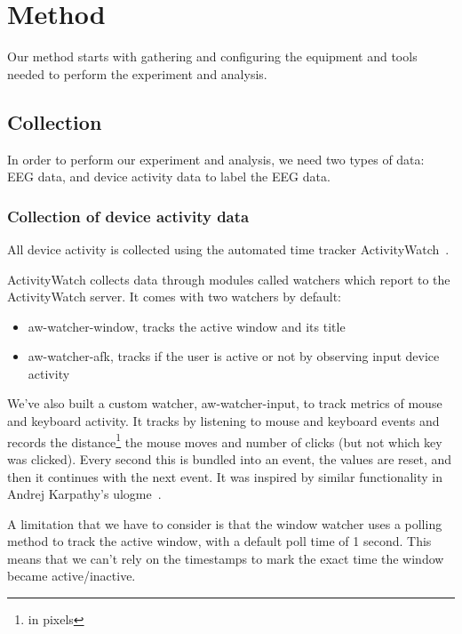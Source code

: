 \chapter{Method}

Our method starts with gathering and configuring the equipment and tools needed to perform the experiment and analysis.

\section{Collection}

In order to perform our experiment and analysis, we need two types of data: EEG data, and device activity data to label the EEG data.

    \subsection{Collection of device activity data}

        All device activity is collected using the automated time tracker ActivityWatch~\cite{bjareholt_activitywatch_2020-1}.

        ActivityWatch collects data through modules called watchers which report to the ActivityWatch server. It comes with two watchers by default:

        \begin{itemize}
            \item aw-watcher-window, tracks the active window and its title
            \item aw-watcher-afk, tracks if the user is active or not by observing input device activity
        \end{itemize}

        We've also built a custom watcher, aw-watcher-input, to track metrics of mouse and keyboard activity. It tracks by listening to mouse and keyboard events and records the distance\footnote{in pixels} the mouse moves and number of clicks (but not which key was clicked). Every second this is bundled into an event, the values are reset, and then it continues with the next event. It was inspired by similar functionality in Andrej Karpathy's ulogme~\cite{karpathy_ulogme_2016}.

        A limitation that we have to consider is that the window watcher uses a polling method to track the active window, with a default poll time of 1 second. This means that we can't rely on the timestamps to mark the exact time the window became active/inactive.

